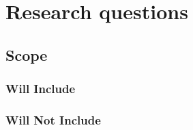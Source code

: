 \newpage
\section{Research questions}

\subsection{Scope}

\subsubsection*{Will Include}

\subsubsection*{Will Not Include}
